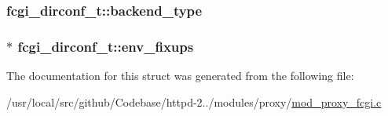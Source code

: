 \subsubsection[{\texorpdfstring{backend\+\_\+type}{backend_type}}]{ fcgi\+\_\+dirconf\+\_\+t\+::backend\+\_\+type}\hypertarget{structfcgi__dirconf__t_a86ac17987b9273fee61599b962112169}{}\label{structfcgi__dirconf__t_a86ac17987b9273fee61599b962112169}
\subsubsection[{\texorpdfstring{env\+\_\+fixups}{env_fixups}}]{$\ast$ fcgi\+\_\+dirconf\+\_\+t\+::env\+\_\+fixups}\hypertarget{structfcgi__dirconf__t_a7da066992e5c7fd108b0acbb43f8a8da}{}\label{structfcgi__dirconf__t_a7da066992e5c7fd108b0acbb43f8a8da}


The documentation for this struct was generated from the following file\+:\begin{DoxyCompactItemize}
\item 
/usr/local/src/github/\+Codebase/httpd-\/2../modules/proxy/\hyperlink{mod__proxy__fcgi_8c}{mod\+\_\+proxy\+\_\+fcgi.\+c}\end{DoxyCompactItemize}
